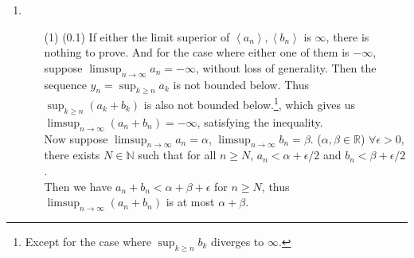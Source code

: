 \documentclass[12pt]{report}
\newcommand{\numl}[1]{\item[\large\textbf{\sffamily #1.}]}
\newcommand{\bb}[1]{\mathbb{#1}}
\renewcommand{\span}[1]{\left\langle #1 \right\rangle}
\newcommand{\ds}{\displaystyle}
\begin{document}
\begin{enumerate}
\numl{4} 
\begin{enumerate}
	\item[(1)] (0.1) If either the limit superior of $\span{a_n}, \span{b_n}$ is $\infty$, there is nothing to prove. And for the case where either one of them is $-\infty$, suppose $\ds\limsup_{n\rightarrow \infty}a_n=-\infty$, without loss of generality. Then the sequence $y_n=\sup_{k\geq n}a_k$ is not bounded below. Thus $\sup_{k\geq n}(a_k+b_k)$ is also not bounded below.\footnote{Except for the case where $\sup_{k\geq n}b_k$ diverges to $\infty$.}, which gives us $\ds \limsup_{n\rightarrow \infty}(a_n+b_n) = -\infty$, satisfying the inequality.\\
	Now suppose $\ds\limsup_{n\rightarrow \infty}a_n = \alpha$, $\ds \limsup_{n\rightarrow \infty} b_n = \beta$. ($\alpha, \beta \in \bb{R}$) $\forall \epsilon > 0$, there exists $N\in \bb{N}$ such that for all $n\geq N$, $a_n < \alpha + \epsilon/2$ and $b_n < \beta + \epsilon /2$. \\Then we have $a_n+b_n < \alpha + \beta + \epsilon$ for $n\geq N$, thus $\ds\limsup_{n\rightarrow \infty}(a_n+b_n)$ is at most $\alpha+\beta$.\\
	

\end{enumerate}
\end{enumerate}
\end{document}
